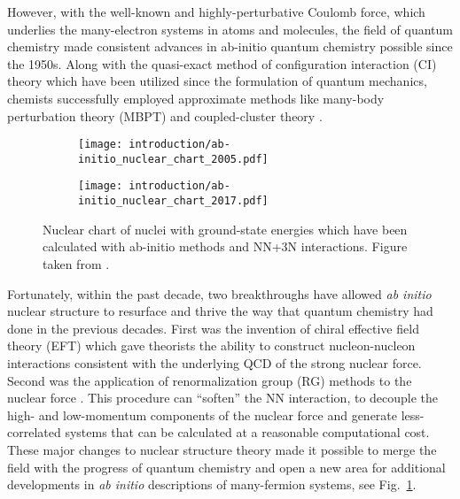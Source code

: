 \documentclass[../thesis.tex]{subfiles}
\begin{document}
However, with the well-known and highly-perturbative Coulomb force, which underlies the many-electron systems in atoms and molecules, the field of quantum chemistry made consistent advances in ab-initio quantum chemistry possible since the 1950s.  Along with the quasi-exact method of configuration interaction (CI) theory \cite{SLATER19291293,CONDON19301121,BACHER1933264,UFFORD1933732} which have been utilized since the formulation of quantum mechanics, chemists successfully employed approximate methods like many-body perturbation theory (MBPT) \cite{HUBBARD1957539,HUGENHOLTZ1957481,SCHAEFER1984,SHAVITT2009} and coupled-cluster theory \cite{CIZEK19664256,CIZEK1971359,CIZEK1980251,PIECUCH2002527,SHAVITT2009}.

\begin{figure}[h]
  \centering
  \begin{subfigure}{0.7\textwidth}
    \centering
    \texttt{[image: introduction/ab-initio\_nuclear\_chart\_2005.pdf]}
  \end{subfigure}
  
  \begin{subfigure}{0.7\textwidth}
    \centering
    \texttt{[image: introduction/ab-initio\_nuclear\_chart\_2017.pdf]}
  \end{subfigure}
  \caption{Nuclear chart of nuclei with ground-state energies which have been calculated with ab-initio methods and NN+3N interactions.  Figure taken from \cite{HERGERTPRIVATE}.}
  \label{fig:AbInitioChart}
\end{figure}

Fortunately, within the past decade, two breakthroughs have allowed \emph{ab initio} nuclear structure to resurface and thrive the way that quantum chemistry had done in the previous decades.  First was the invention of chiral effective field theory (EFT) \cite{EPELBAUM20091773,MACHLEIDT20111} which gave theorists the ability to construct nucleon-nucleon interactions consistent with the underlying QCD of the strong nuclear force.  Second was the application of renormalization group (RG) methods to the nuclear force \cite{BOGNER201094,ROTH2011072501}.  This procedure can ``soften'' the NN interaction, to decouple the high- and low-momentum components of the nuclear force and generate less-correlated systems that can be calculated at a reasonable computational cost.  These major changes to nuclear structure theory made it possible to merge the field with the progress of quantum chemistry and open a new area for additional developments in \emph{ab initio} descriptions of many-fermion systems, see Fig.\ \ref{fig:AbInitioChart}.
\end{document}
